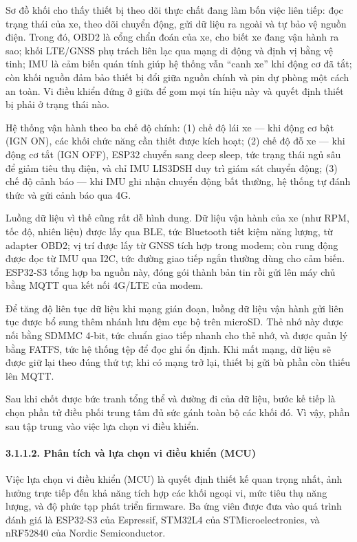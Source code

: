 \documentclass[a4paper]{extarticle}
\begin{document}
Sơ đồ khối cho thấy thiết bị theo dõi thực chất đang làm bốn việc liên tiếp: đọc
trạng thái của xe, theo dõi chuyển động, gửi dữ liệu ra ngoài và tự bảo
vệ nguồn điện. Trong đó, OBD2 là cổng chẩn đoán của xe, cho biết xe đang
vận hành ra sao; khối LTE/GNSS phụ trách liên lạc qua mạng di động và
định vị bằng vệ tinh; IMU là cảm biến quán tính giúp hệ thống vẫn ``canh
xe'' khi động cơ đã tắt; còn khối nguồn đảm bảo thiết bị đổi giữa nguồn
chính và pin dự phòng một cách an toàn. Vi điều khiển đứng ở giữa để gom
mọi tín hiệu này và quyết định thiết bị phải ở trạng thái nào.

Hệ thống vận hành theo ba chế độ chính: (1) chế độ lái xe --- khi động cơ
bật (IGN ON), các khối chức năng cần thiết được kích hoạt; (2) chế độ đỗ
xe --- khi động cơ tắt (IGN OFF), ESP32 chuyển sang deep sleep, tức trạng
thái ngủ sâu để giảm tiêu thụ điện, và chỉ IMU LIS3DSH duy trì giám sát
chuyển động; (3) chế độ cảnh báo --- khi IMU ghi nhận chuyển động bất
thường, hệ thống tự đánh thức và gửi cảnh báo qua 4G.

Luồng dữ liệu vì thế cũng rất dễ hình dung. Dữ liệu vận hành của xe
(như RPM, tốc độ, nhiên liệu) được lấy qua BLE, tức Bluetooth tiết kiệm
năng lượng, từ adapter OBD2; vị trí được lấy từ GNSS tích hợp trong
modem; còn rung động được đọc từ IMU qua I2C, tức đường giao tiếp ngắn
thường dùng cho cảm biến. ESP32-S3 tổng hợp ba nguồn này, đóng gói thành
bản tin rồi gửi lên máy chủ bằng MQTT qua kết nối 4G/LTE của modem.

Để tăng độ liên tục dữ liệu khi mạng gián đoạn, luồng dữ liệu vận hành
gửi liên tục được bổ sung thêm nhánh lưu đệm cục
bộ trên microSD. Thẻ nhớ này được nối bằng SDMMC 4-bit, tức chuẩn giao
tiếp nhanh cho thẻ nhớ, và được quản lý bằng FATFS, tức hệ thống tệp để
đọc ghi ổn định. Khi mất mạng, dữ liệu sẽ được giữ lại theo đúng thứ tự;
khi có mạng trở lại, thiết bị gửi bù phần còn thiếu lên MQTT.

Sau khi chốt được bức tranh tổng thể và đường đi của dữ liệu, bước kế
tiếp là chọn phần tử điều phối trung tâm đủ sức gánh toàn bộ các khối
đó. Vì vậy, phần sau tập trung vào việc lựa chọn vi điều khiển.

\paragraph{3.1.1.2. Phân tích và lựa chọn vi điều khiển
(MCU)}\label{3112-phuxe2n-tuxedch-vuxe0-lux1ef1a-chux1ecdn-vi-ux111iux1ec1u-khiux1ec3n-mcu}

Việc lựa chọn vi điều khiển (MCU) là quyết định thiết kế quan trọng
nhất, ảnh hưởng trực tiếp đến khả năng tích hợp các khối ngoại vi, mức
tiêu thụ năng lượng, và độ phức tạp phát triển firmware. Ba ứng viên
được đưa vào quá trình đánh giá là ESP32-S3 của Espressif, STM32L4 của
STMicroelectronics, và nRF52840 của Nordic Semiconductor.
\end{document}
